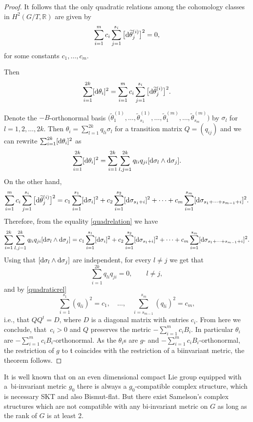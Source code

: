 \begin{proof}
It follows that the only quadratic relations among the cohomology classes in $H^2(G/T, \mathbb{R})$ are given by
\begin{equation}\label{quadraticrel}
 \sum_{i=1}^m c_i\sum_{j=1}^{s_i} \big[{\rm d}\widetilde{\theta}^{(i)}_j\big]^2 = 0, \end{equation} for some constants $c_1, \dots, c_m$.

Then
\begin{equation} \label{quadrelation}
\sum_{i=1}^{2k} [{\rm d}\theta_i]^2 = \sum_{i=1}^m c_i\sum_{j=1}^{s_i} \big[{\rm d}\widetilde{\theta}^{(i)}_j\big]^2.
\end{equation}

Denote the $-B$-orthonormal basis $\big(\widetilde{\theta}_1^{(1)}, \dots, \widetilde{\theta}_{s_1}^{(1)}, \dots, \widetilde{\theta}_1^{(m)}, \dots, \widetilde{\theta}_{s_m}^{(m)}\big)$ by $\sigma_l$ for $l=1,2,\dots ,2k$. Then $\theta_i = \sum_{l=1}^{2k} q_{li}\sigma_l$ for a transition matrix $Q = (q_{ij})$
and we can rewrite $\sum_{i=1}^{2k} [{\rm d}\theta_i]^2$ as
\[
\sum_{i=1}^{2k} [{\rm d}\theta_i]^2 = \sum_{i = 1}^{2k} \sum_{l,j =1}^{2k} q_{li} q_{ji} [{\rm d}\sigma_l \wedge {\rm d} \sigma_j].
\]
 On the other hand,
\[
 \sum_{i=1}^m c_i\sum_{j=1}^{s_i} \big[{\rm d}\widetilde{\theta}^{(i)}_j\big]^2 = c_1 \sum_{i =1}^{s_1} [{\rm d} \sigma_i]^2 + c_2 \sum_{i =1}^{s_2} [{\rm d} \sigma_{s_1 +i}]^2 + \dots + c_m \sum_{i =1}^{s_m} [{\rm d} \sigma_{s_1 + \dots + s_{m-1} + i} ]^2.
\]
Therefore, from the equality \eqref{quadrelation} we have
\[
 \sum_{i = 1}^{2k} \sum_{l,j =1}^{2k} q_{li} q_{ji} [{\rm d} \sigma_l \wedge {\rm d} \sigma_j] = c_1 \sum_{i =1}^{s_1} [{\rm d} \sigma_i]^2 + c_2 \sum_{i =1}^{s_2} [{\rm d} \sigma_{s_1 +i}]^2 + \dots + c_m \sum_{i =1}^{s_m} [{\rm d} \sigma_{s_1 + \dots + s_{m-1} + i} ]^2.
\]
Using that $[{\rm d}\sigma_l\wedge {\rm d}\sigma_j]$ are independent, for every $l\neq j$ we get that
\[
\sum_{i = 1}^{2k} q_{li} q_{ji} =0, \qquad l \neq j,
\]
and by \eqref{quadraticrel}
\[
\sum_{i =1}^{s_1} (q_{li})^2 = c_1, \quad \dots, \quad \sum_{i =s_{m-1}}^{s_m} (q_{li})^2 = c_m,
\]
i.e., that $QQ^t= D$, where $D$ is a diagonal matrix with entries $c_i$. From here we conclude, that~$c_i > 0$ and $Q$ preserves the metric $-\sum_{i = 1}^m c_i B_i$. In particular $\theta_i$ are $-\sum_{i=1}^m c_i B_i$-or\-thonor\-mal. As the $\theta_i$s are $g$- and $-\sum_{i=1}^m c_i B_i$-orthonormal, the restriction of $g$ to $\mathfrak t$ coincides with the restriction of a biinvariant metric, the theorem follows.
\end{proof}


\begin{Remark} It is well known that on an even dimensional compact Lie group equipped with a~bi-invariant metric $g_0$ there is always a $g_0$-compatible complex structure, which is necessary SKT and also Bismut-flat. But there exist Samelson's complex structures which are not compatible with any bi-invariant metric on $G$ as long as the rank of $G$ is at least 2.
\end{Remark}
